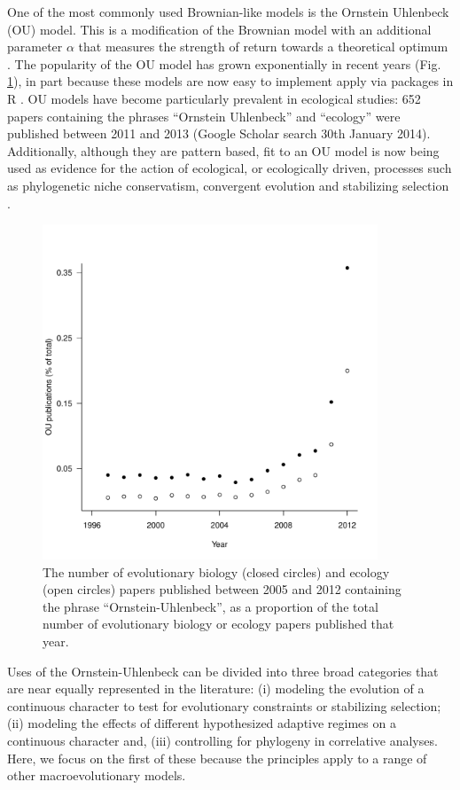 \documentclass[a4paper,12pt]{article}
\begin{document}
One of the most commonly used Brownian-like models is the Ornstein Uhlenbeck (OU) model. This is a modification of the Brownian model with an additional parameter $\alpha$ that measures the strength of return towards a theoretical optimum \citep{hansen1997stabilizing}. The popularity of the OU model has grown exponentially in recent years (Fig. \ref{figure.literature}), in part because these models are now easy to implement apply via packages in R \citep[e.g. ouch, GEIGER and OUwie;][]{Butler:2004aa,Harmon:2008aa,beaulieu2012ouwie}. OU models have become particularly prevalent in ecological studies: 652 papers containing the phrases “Ornstein Uhlenbeck” and “ecology” were published between 2011 and 2013 (Google Scholar search 30th January 2014). Additionally, although they are pattern based, fit to an OU model is now being used as evidence for the action of ecological, or ecologically driven, processes such as phylogenetic niche conservatism, convergent evolution and stabilizing selection \citep[e.g.,][]{Wiens:2010aa,christin2013anatomical,ingram2013surface}.

\begin{figure}
\centering
    \includegraphics[width=10cm, height=10cm, keepaspectratio=true]{Figures/OU_figure1.pdf}
\caption{The number of evolutionary biology (closed circles) and ecology (open circles) papers published between 2005 and 2012 containing the phrase “Ornstein-Uhlenbeck”, as a proportion of the total number of evolutionary biology or ecology papers published that year.}
\label{figure.literature}
\end{figure}

Uses of the Ornstein-Uhlenbeck can be divided into three broad categories that are near equally represented in the literature: (i) modeling the evolution of a continuous character to test for evolutionary constraints or stabilizing selection; (ii) modeling the effects of different hypothesized adaptive regimes on a continuous character and, (iii) controlling for phylogeny in correlative analyses. Here, we focus on the first of these because the principles apply to a range of other macroevolutionary models.  
\end{document}
